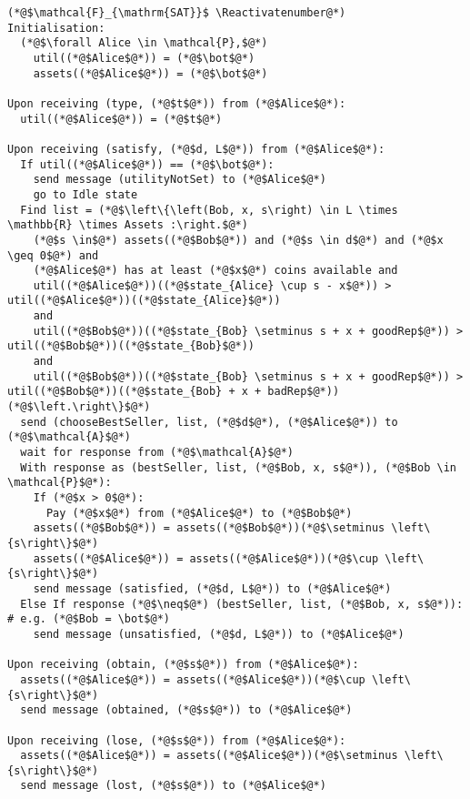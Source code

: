 \Suppressnumber
\begin{lstlisting}[label=satfunc, style=numbers]
(*@$\mathcal{F}_{\mathrm{SAT}}$ \Reactivatenumber@*)
Initialisation:
  (*@$\forall Alice \in \mathcal{P},$@*)
    util((*@$Alice$@*)) = (*@$\bot$@*)
    assets((*@$Alice$@*)) = (*@$\bot$@*)

Upon receiving (type, (*@$t$@*)) from (*@$Alice$@*):
  util((*@$Alice$@*)) = (*@$t$@*)

Upon receiving (satisfy, (*@$d, L$@*)) from (*@$Alice$@*):
  If util((*@$Alice$@*)) == (*@$\bot$@*):
    send message (utilityNotSet) to (*@$Alice$@*)
    go to Idle state
  Find list = (*@$\left\{\left(Bob, x, s\right) \in L \times \mathbb{R} \times Assets :\right.$@*)
    (*@$s \in$@*) assets((*@$Bob$@*)) and (*@$s \in d$@*) and (*@$x \geq 0$@*) and
    (*@$Alice$@*) has at least (*@$x$@*) coins available and
    util((*@$Alice$@*))((*@$state_{Alice} \cup s - x$@*)) > util((*@$Alice$@*))((*@$state_{Alice}$@*))
    and
    util((*@$Bob$@*))((*@$state_{Bob} \setminus s + x + goodRep$@*)) > util((*@$Bob$@*))((*@$state_{Bob}$@*))
    and
    util((*@$Bob$@*))((*@$state_{Bob} \setminus s + x + goodRep$@*)) > util((*@$Bob$@*))((*@$state_{Bob} + x + badRep$@*))(*@$\left.\right\}$@*)
  send (chooseBestSeller, list, (*@$d$@*), (*@$Alice$@*)) to (*@$\mathcal{A}$@*)
  wait for response from (*@$\mathcal{A}$@*)
  With response as (bestSeller, list, (*@$Bob, x, s$@*)), (*@$Bob \in \mathcal{P}$@*):
    If (*@$x > 0$@*):
      Pay (*@$x$@*) from (*@$Alice$@*) to (*@$Bob$@*)
    assets((*@$Bob$@*)) = assets((*@$Bob$@*))(*@$\setminus \left\{s\right\}$@*)
    assets((*@$Alice$@*)) = assets((*@$Alice$@*))(*@$\cup \left\{s\right\}$@*)
    send message (satisfied, (*@$d, L$@*)) to (*@$Alice$@*)
  Else If response (*@$\neq$@*) (bestSeller, list, (*@$Bob, x, s$@*)): # e.g. (*@$Bob = \bot$@*)
    send message (unsatisfied, (*@$d, L$@*)) to (*@$Alice$@*)

Upon receiving (obtain, (*@$s$@*)) from (*@$Alice$@*):
  assets((*@$Alice$@*)) = assets((*@$Alice$@*))(*@$\cup \left\{s\right\}$@*)
  send message (obtained, (*@$s$@*)) to (*@$Alice$@*)

Upon receiving (lose, (*@$s$@*)) from (*@$Alice$@*):
  assets((*@$Alice$@*)) = assets((*@$Alice$@*))(*@$\setminus \left\{s\right\}$@*)
  send message (lost, (*@$s$@*)) to (*@$Alice$@*)
\end{lstlisting}
